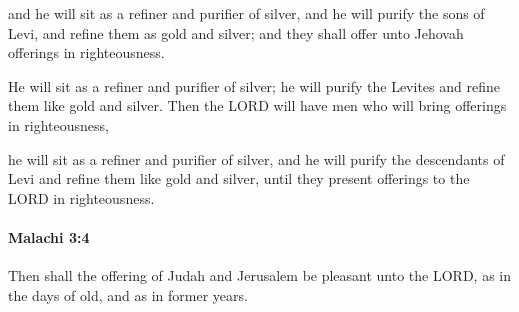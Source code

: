 			\begin{versebox}
					\item[BHS] 
					\item[LXX] 
					\item[ASV] and he will sit as a refiner and purifier of silver, and he will purify the sons of Levi, and refine them as gold and silver; and they shall offer unto Jehovah offerings in righteousness.
					\item[NIV] He will sit as a refiner and purifier of silver; he will purify the Levites and refine them like gold and silver. Then the LORD will have men who will bring offerings in righteousness,
					\item[NRSV] he will sit as a refiner and purifier of silver, and he will purify the descendants of Levi and refine them like gold and silver, until they present offerings to the LORD in righteousness.
			\end{versebox}

		\paragraph{Malachi 3:4} %
			\label{MALACHI-3-4}

			Then shall the offering of Judah and Jerusalem be pleasant unto the LORD, as in the days of old, and as in former years.


